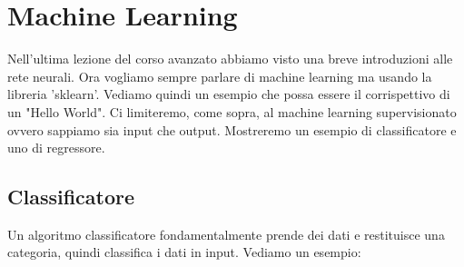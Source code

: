 \documentclass[10pt,a4paper]{article}
\begin{document}
\newpage

\section{Machine Learning}
Nell'ultima lezione del corso avanzato abbiamo visto una breve introduzioni alle rete neurali. Ora vogliamo sempre parlare di machine learning ma usando la libreria 'sklearn'. Vediamo quindi un esempio che possa essere il corrispettivo di un "Hello World". Ci limiteremo, come sopra, al machine learning supervisionato ovvero sappiamo sia input che output. Mostreremo un esempio di classificatore e uno di regressore.

\subsection{Classificatore}
Un algoritmo classificatore fondamentalmente prende dei dati e restituisce una categoria, quindi classifica i dati in input. Vediamo un esempio:
\end{document}
